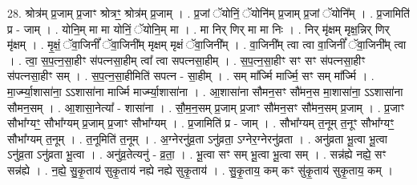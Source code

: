 \documentclass[17pt]{extarticle}
\begin{document}
28. श्रोत्र॑म् प्र॒जाम् प्र॒जाꣳ श्रोत्रꣳ॒॒ श्रोत्र॑म् प्र॒जाम् । . प्र॒जां ॅयोनिं॒ ॅयोनि॑म् प्र॒जाम् प्र॒जां ॅयोनि᳚म् । . प्र॒जामिति॑ प्र - जाम् । . योनि॒म् मा मा योनिं॒ ॅयोनि॒म् मा । . मा निर् णिर् मा मा निः । . निर् मृ॑क्षम् मृक्ष॒न्निर् णिर् मृ॑क्षम् । . मृ॒क्षं॒ ॅवा॒जिनीं᳚ ॅवा॒जिनी᳚म् मृक्षम् मृक्षं ॅवा॒जिनी᳚म् । . वा॒जिनी᳚म् त्वा त्वा वा॒जिनीं᳚ ॅवा॒जिनी᳚म् त्वा । . त्वा॒ स॒प॒त्न॒सा॒हीꣳ स॑पत्नसा॒हीम् त्वा᳚ त्वा सपत्नसा॒हीम् । . स॒प॒त्न॒सा॒हीꣳ सꣳ सꣳ स॑पत्नसा॒हीꣳ स॑पत्नसा॒हीꣳ सम् । . स॒प॒त्न॒सा॒हीमिति॑ सपत्न - सा॒हीम् । . सम् मा᳚र्ज्मि मार्ज्मि॒ सꣳ सम् मा᳚र्ज्मि । . मा॒र्ज्म्या॒शासा॑ना॒ ऽऽशासा॑ना मार्ज्मि मार्ज्म्या॒शासा॑ना । . आ॒शासा॑ना सौमन॒सꣳ सौ॑मन॒स मा॒शासा॑ना॒ ऽऽशासा॑ना सौमन॒सम् । . आ॒शासा॒नेत्या᳚ - शासा॑ना । . सौ॒म॒न॒सम् प्र॒जाम् प्र॒जाꣳ सौ॑मन॒सꣳ सौ॑मन॒सम् प्र॒जाम् । . प्र॒जाꣳ सौभा᳚ग्यꣳ॒॒ सौभा᳚ग्यम् प्र॒जाम् प्र॒जाꣳ सौभा᳚ग्यम् । . प्र॒जामिति॑ प्र - जाम् । . सौभा᳚ग्यम् त॒नूम् त॒नूꣳ सौभा᳚ग्यꣳ॒॒ सौभा᳚ग्यम् त॒नूम् । . त॒नूमिति॑ त॒नूम् । . अ॒ग्नेरनु॑व्र॒ता ऽनु॑व्रता॒ ऽग्नेर॒ग्नेरनु॑व्रता । . अनु॑व्रता भू॒त्वा भू॒त्वा ऽनु॑व्र॒ता ऽनु॑व्रता भू॒त्वा । . अनु॑व्र॒तेत्यनु॑ - व्र॒ता॒ । . भू॒त्वा सꣳ सम् भू॒त्वा भू॒त्वा सम् । . सन्न॑ह्ये नह्ये॒ सꣳ सन्न॑ह्ये । . न॒ह्ये॒ सु॒कृ॒ताय॑ सुकृ॒ताय॑ नह्ये नह्ये सुकृ॒ताय॑ । . सु॒कृ॒ताय॒ कम् कꣳ सु॑कृ॒ताय॑ सुकृ॒ताय॒ कम् । \newline
\end{document}
